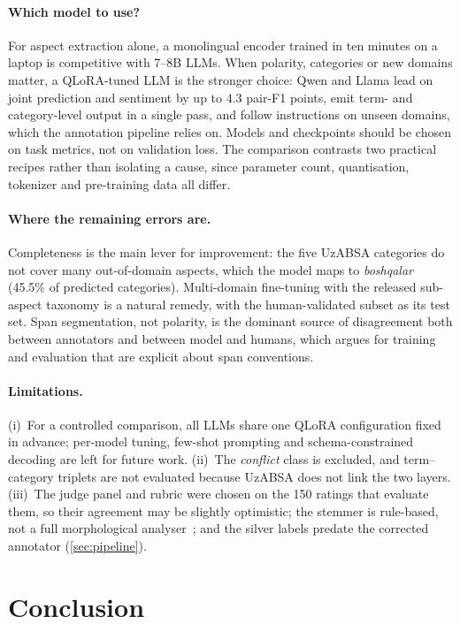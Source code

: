 \documentclass[runningheads]{llncs}
\begin{document}
\paragraph{Which model to use?} For aspect extraction alone, a monolingual encoder trained in ten minutes on a laptop is competitive with 7--8B LLMs. When polarity, categories or new domains matter, a QLoRA-tuned LLM is the stronger choice: Qwen and Llama lead on joint prediction and sentiment by up to 4.3 pair-F1 points, emit term- and category-level output in a single pass, and follow instructions on unseen domains, which the annotation pipeline relies on. Models and checkpoints should be chosen on task metrics, not on validation loss. The comparison contrasts two practical recipes rather than isolating a cause, since parameter count, quantisation, tokenizer and pre-training data all differ.

\paragraph{Where the remaining errors are.} Completeness is the main lever for improvement: the five UzABSA categories do not cover many out-of-domain aspects, which the model maps to \textit{boshqalar} (45.5\% of predicted categories). Multi-domain fine-tuning with the released sub-aspect taxonomy is a natural remedy, with the human-validated subset as its test set. Span segmentation, not polarity, is the dominant source of disagreement both between annotators and between model and humans, which argues for training and evaluation that are explicit about span conventions.

\paragraph{Limitations.} (i)~For a controlled comparison, all LLMs share one QLoRA configuration fixed in advance; per-model tuning, few-shot prompting and schema-constrained decoding are left for future work. (ii)~The \textit{conflict} class is excluded, and term--category triplets are not evaluated because UzABSA does not link the two layers. (iii)~The judge panel and rubric were chosen on the 150 ratings that evaluate them, so their agreement may be slightly optimistic; the stemmer is rule-based, not a full morphological analyser~\cite{Salaev2024}; and the silver labels predate the corrected annotator (\cref{sec:pipeline}).

\section{Conclusion}
\label{sec:conclusion}
\end{document}
